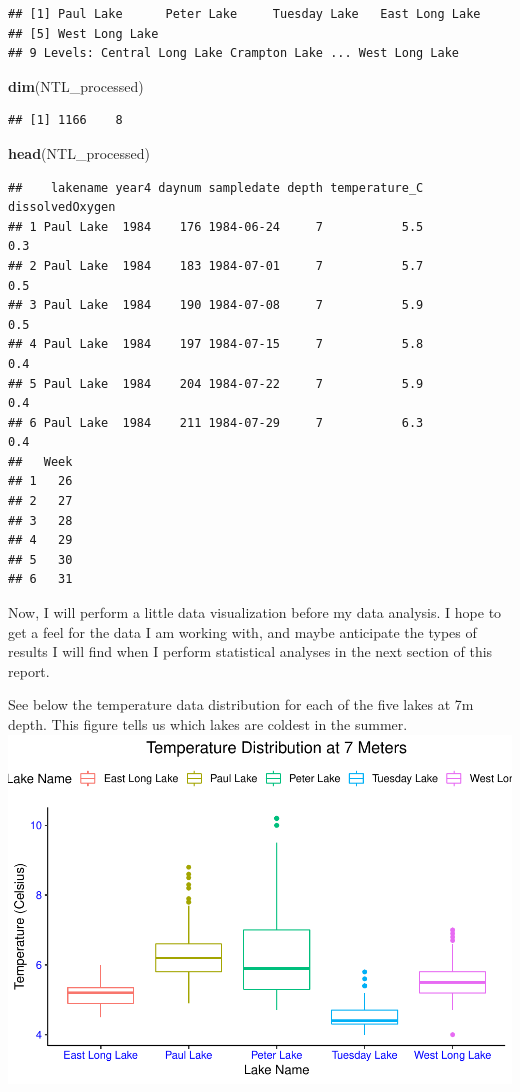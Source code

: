 \documentclass[12pt,]{article}
\newenvironment{Shaded}{\begin{snugshade}}{\end{snugshade}}
\newcommand{\KeywordTok}[1]{\textcolor[rgb]{0.13,0.29,0.53}{\textbf{#1}}}
\newcommand{\NormalTok}[1]{#1}
\begin{document}
\begin{verbatim}
## [1] Paul Lake      Peter Lake     Tuesday Lake   East Long Lake
## [5] West Long Lake
## 9 Levels: Central Long Lake Crampton Lake ... West Long Lake
\end{verbatim}

\begin{Shaded}
\begin{Highlighting}[]
\KeywordTok{dim}\NormalTok{(NTL_processed)}
\end{Highlighting}
\end{Shaded}

\begin{verbatim}
## [1] 1166    8
\end{verbatim}

\begin{Shaded}
\begin{Highlighting}[]
\KeywordTok{head}\NormalTok{(NTL_processed)}
\end{Highlighting}
\end{Shaded}

\begin{verbatim}
##    lakename year4 daynum sampledate depth temperature_C dissolvedOxygen
## 1 Paul Lake  1984    176 1984-06-24     7           5.5             0.3
## 2 Paul Lake  1984    183 1984-07-01     7           5.7             0.5
## 3 Paul Lake  1984    190 1984-07-08     7           5.9             0.5
## 4 Paul Lake  1984    197 1984-07-15     7           5.8             0.4
## 5 Paul Lake  1984    204 1984-07-22     7           5.9             0.4
## 6 Paul Lake  1984    211 1984-07-29     7           6.3             0.4
##   Week
## 1   26
## 2   27
## 3   28
## 4   29
## 5   30
## 6   31
\end{verbatim}

Now, I will perform a little data visualization before my data analysis.
I hope to get a feel for the data I am working with, and maybe
anticipate the types of results I will find when I perform statistical
analyses in the next section of this report.

See below the temperature data distribution for each of the five lakes
at 7m depth. This figure tells us which lakes are coldest in the summer.
\includegraphics{KeithBollt_ENV872_FinalProject_files/figure-latex/visualization-1.pdf}
\end{document}
